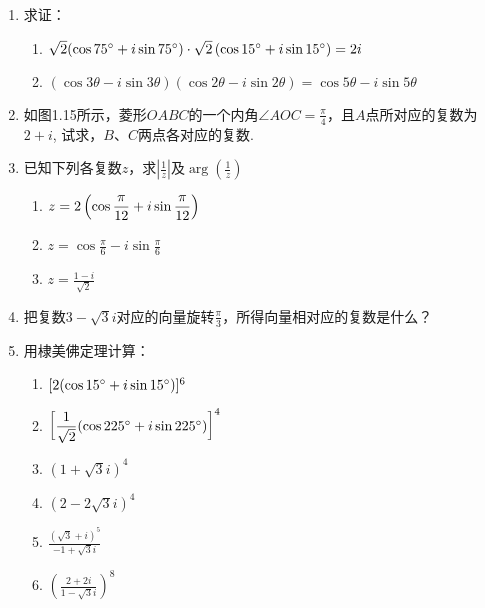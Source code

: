\begin{enumerate}
\item 求证：
\begin{enumerate}[(1)]
    \item $\sqrt{2}(\cos{75^{\circ}}+i\sin{75^{\circ}})\cdot \sqrt{2}\left(\cos{15^{\circ}}+i\sin{15^{\circ}}\right)=2i$
    \item $(\cos3\theta-i\sin3\theta)(\cos2\theta-i\sin2\theta)=\cos5\theta-i\sin5\theta$
\end{enumerate}

\item 如图1.15所示，菱形$OABC$的一个内角$\angle AOC=\frac{\pi}{4}$，且$A$点所对应的复数为$2+i$, 试求，$B$、$C$两点各对应的复数.

\begin{figure}[htp]
    \centering
{}
    \caption{}
\end{figure}


\item 已知下列各复数$z$，求$\left|\frac{1}{z}\right|$及$\arg\left(\frac{1}{z}\right)$
\begin{multicols}{2}
\begin{enumerate}[(1)]
    \item $z=2\left(\cos{\dfrac{\pi}{12}}+i\sin{\dfrac{\pi}{12}}\right)$
    \item $z=\cos\frac{\pi}{6}-i\sin\frac{\pi}{6}$
    \item $z=\frac{1-i}{\sqrt{2}}$
\end{enumerate}    
\end{multicols}

\item 把复数$3-\sqrt{3}i$对应的向量旋转$\frac{\pi}{3}$，所得向量相对应的复数是什么？

\item 用棣美佛定理计算：
\begin{multicols}{2}
\begin{enumerate}[(1)]
    \item $[2(\cos{15^{\circ}}+i\sin{15^{\circ}})]^6$
    \item $\left[\dfrac{1}{\sqrt{2}}(\cos{225^{\circ}}+i\sin{225^{\circ}})\right]^4$
    \item $(1+\sqrt{3}i)^4$
    \item $(2-2\sqrt{3}i)^4$
    \item $\frac{(\sqrt{3}+i)^5}{-1+\sqrt{3}i}$
    \item $\left(\frac{2+2i}{1-\sqrt{3}i}\right)^8$
\end{enumerate}
\end{multicols}


\end{enumerate}

